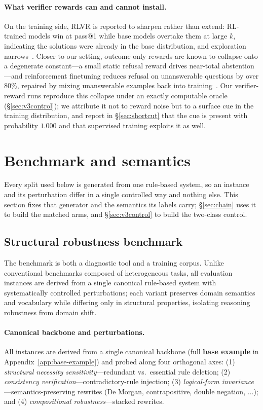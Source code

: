 \documentclass{article}
\begin{document}
\paragraph{What verifier rewards can and cannot install.}
On the training side, RLVR is reported to sharpen rather than extend: RL-trained
models win at pass@1 while base models overtake them at large $k$, indicating
the solutions were already in the base distribution, and exploration
narrows~\citep{yue2025limitrlvr}. Closer to our setting, outcome-only rewards
are known to collapse onto a degenerate constant---a small static refusal reward
drives near-total abstention---and reinforcement finetuning reduces refusal on
unanswerable questions by over 80\%, repaired by mixing unanswerable examples
back into training~\citep{song2025hallucinationtax}. Our verifier-reward runs
reproduce this collapse under an exactly computable oracle
(\S\ref{sec:v3control}); we attribute it not to reward noise but to a surface
cue in the training distribution, and report in \S\ref{sec:shortcut} that the
cue is present with probability $1.000$ and that supervised training exploits it
as well.

\section{Benchmark and semantics}
\label{sec:method}
Every split used below is generated from one rule-based system, so an instance
and its perturbation differ in a single controlled way and nothing else. This
section fixes that generator and the semantics its labels carry; \S\ref{sec:chain}
uses it to build the matched arms, and \S\ref{sec:v3control} to build the
two-class control.

\subsection{Structural robustness benchmark}

The benchmark is both a diagnostic tool and a training corpus. Unlike conventional benchmarks composed of heterogeneous tasks, all evaluation instances are derived from a single canonical rule-based system with systematically controlled perturbations; each variant preserves domain semantics and vocabulary while differing only in structural properties, isolating reasoning robustness from domain shift.

\paragraph{Canonical backbone and perturbations.}
All instances are derived from a single canonical backbone (full \textbf{base example} in Appendix~\ref{app:base-example}) and probed along four orthogonal axes: (1) \emph{structural necessity sensitivity}---redundant vs.\ essential rule deletion; (2) \emph{consistency verification}---contradictory-rule injection; (3) \emph{logical-form invariance}---semantics-preserving rewrites (De Morgan, contrapositive, double negation, $\ldots$); and (4) \emph{compositional robustness}---stacked rewrites.
\end{document}
